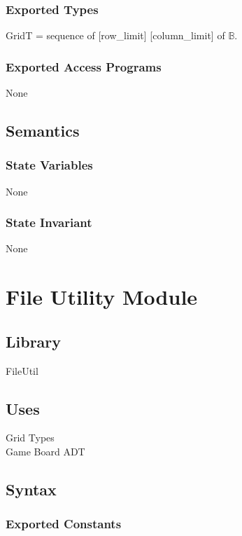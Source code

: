 \documentclass[12pt]{article}
\begin{document}
\subsubsection* {Exported Types}

GridT = sequence of [row\_limit] [column\_limit] of $\mathbb{B}$.

\subsubsection* {Exported Access Programs}

None

\subsection* {Semantics}

\subsubsection* {State Variables}

None

\subsubsection* {State Invariant}

None

\newpage

\section* {File Utility Module}

\subsection*{Library}

FileUtil

\subsection* {Uses}

Grid Types \\
Game Board ADT

\subsection* {Syntax}

\subsubsection* {Exported Constants}
\end{document}
